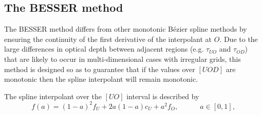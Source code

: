 \subsection{The BESSER method}

The BESSER method \citep{Stepan2013} differs from other monotonic Bézier spline methods by ensuring the continuity of the first derivative of the interpolant at $O$.
Due to the large differences in optical depth between adjacent regions (e.g. $\tau_{UO}$ and $\tau_{OD}$) that are likely to occur in multi-dimensional cases with irregular grids, this method is designed so as to guarantee that if the values over $[UOD]$ are monotonic then the spline interpolant will remain monotonic.

The spline interpolant over the $[UO]$ interval is described by
\begin{equation}
    f(a) = (1-a)^2f_U + 2a(1-a)c_U + a^2f_O,\hspace{3em}a\in[0,1],
\end{equation}

